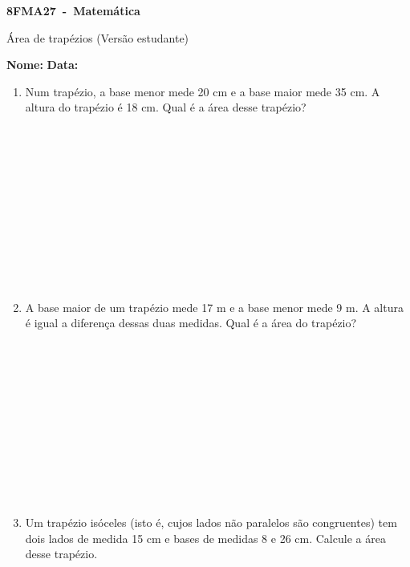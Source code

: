 \documentclass[a4paper,14pt]{article}
\begin{document}
	
	\noindent\textbf{8FMA27~-~Matemática} 
	
	\begin{center}Área de trapézios (Versão estudante)
	\end{center}
	
	
	\noindent\textbf{Nome:} \underline{\hspace{10cm}}
	\noindent\textbf{Data:} \underline{\hspace{4cm}}
	
	
	\begin{multicols}{2}
	    \begin{enumerate}
	    	\item Num trapézio, a base menor mede 20 cm e a base maior mede 35 cm. A altura do trapézio é 18 cm. Qual é a área desse trapézio? \\\\\\\\\\\\\\\\\\\\\\\\
	    	\item A base maior de um trapézio mede 17 m e a base menor mede 9 m. A altura é igual a diferença dessas duas medidas. Qual é a área do trapézio? \\\\\\\\\\\\\\\\\\\\\\\\
	    	\item Um trapézio isóceles (isto é, cujos lados não paralelos são congruentes) tem dois lados de medida 15 cm e bases de medidas 8 e 26 cm. Calcule a área desse trapézio. \\\\\\\\\\\\\\\\\\\\

\end{enumerate}
\end{multicols}
\end{document}
